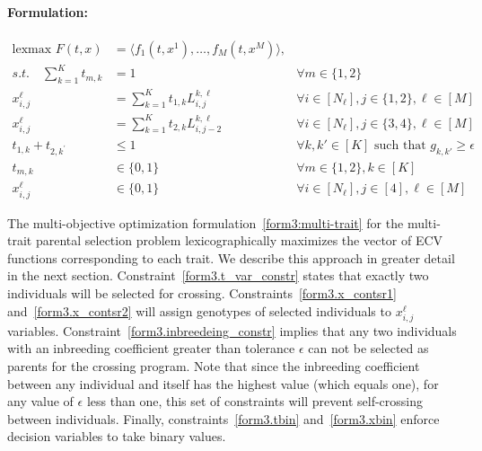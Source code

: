 \documentclass[12pt, a4paper, bibliography=totoc]{scrartcl}
\begin{document}
\paragraph{Formulation:}
\begin{subequations}
\label{form3:multi-trait}
\begin{align}
		\text{lexmax } F(t,x)&=\langle f_1(t,x^1), \ldots,f_M(t,x^M)\rangle, \label{form3.obj} \\
		\textit{s.t.} \quad 
		 \sum_{k = 1}^K t_{m,k} &= 1 &\forall m \in \{1,2\}\label{form3.t_var_constr}\\ 
		x_{i,j}^{\ell} &= \sum_{k = 1}^K t_{1,k}L_{i,j}^{k,\ell}&\forall i \in[N_{\ell}],  j\in \{1,2\}, \ell \in[M]\label{form3.x_contsr1} \\
		x_{i,j}^{\ell} &= \sum_{k = 1}^K t_{2,k}L_{i,j-2}^{k,\ell} &\forall i \in[N_{\ell}],  j\in \{3,4\}, \ell \in[M]\label{form3.x_contsr2}  \\
		 t_{1,k}+t_{2,k^{'}} &\leq 1 &\forall k,k'\in[K]\text{ such that } g_{k,k'}\ge \epsilon \label{form3.inbreedeing_constr}\\
		t_{m,k} &\in\{0,1\} &\forall m\in \{1,2\},  k \in [K]\label{form3.tbin}\\
        x_{i,j}^\ell& \in\{0,1\} &\forall i\in [N_{\ell}],  j \in [4],  \ell \in[M]\label{form3.xbin}
\end{align}
\end{subequations}

The multi-objective optimization  formulation~\eqref{form3:multi-trait} for the multi-trait parental selection problem lexicographically maximizes the vector of ECV functions corresponding to each trait. We describe this approach in greater detail in the next section. Constraint~\eqref{form3.t_var_constr} states that exactly two individuals will be selected for crossing. Constraints~\eqref{form3.x_contsr1} and~\eqref{form3.x_contsr2} will assign genotypes of selected individuals to $x_{i,j}^{\ell}$ variables. Constraint~\eqref{form3.inbreedeing_constr} implies that any two individuals with an inbreeding coefficient greater than tolerance $\epsilon$ can not be selected as parents for the crossing program. Note that since the inbreeding coefficient between any individual and itself has the highest value (which equals one), for any value of $\epsilon$ less than one, this set of constraints will prevent self-crossing between individuals. Finally, constraints~\eqref{form3.tbin} and~\eqref{form3.xbin} enforce decision variables to take binary values. 
\end{document}
